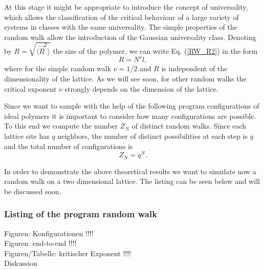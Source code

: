 At this stage it might be appropriate to introduce the concept of 
universality, which allows the classification of the critical 
behaviour of a large variety of systems in classes with the same 
universality. The simple properties of the random walk allow the 
introduction of the Gaussian universality class. Denoting by
$R = \sqrt{\langle \vec{R}^2\rangle}$ the size of the polymer, we 
can write  Eq. (\ref{RW_R2}) in the form
\begin{equation*}
R = N^{\nu}l,
\end{equation*}
where for the simple random walk $\nu = 1/2$ and $R$ is independent of 
the dimensionality of the lattice. As we will see soon, for other 
random walks the critical exponent $\nu$ strongly depends on the 
dimension of the lattice.

Since we want to sample with the help of the following program
configurations of ideal polymers it is important to consider how 
many configurations are possible. To this end we compute the 
number $Z_N$ of distinct random walks. Since each lattice site 
has $q$ neighbors,
the number of distinct possibilities at each step is $q$ and the 
total number of configurations is
\begin{equation}
\label{Z_NRW}
Z_N = q^N.
\end{equation}

In order to demonstrate the above theoretical results we want to 
simulate now a random walk on a two dimensional lattice.
The listing can be seen below and will be discussed soon.

\subsubsection{Listing of the program random walk}

Figuren: Konfigurationen !!!! \\

Figuren: end-to-end !!!!\\

Figuren/Tabelle: kritischer Exponent !!!! \\

Diskussion \\

